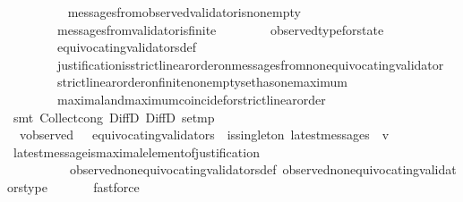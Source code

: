\begin{isabellebody}
\ \isanewline
\ \ \ \ \ \ \ \ messages{\isacharunderscore}from{\isacharunderscore}observed{\isacharunderscore}validator{\isacharunderscore}is{\isacharunderscore}non{\isacharunderscore}empty\isanewline
\ \ \ \ \ \ \ \ messages{\isacharunderscore}from{\isacharunderscore}validator{\isacharunderscore}is{\isacharunderscore}finite\isanewline
\ \ \ \ \ \ \ \ observed{\isacharunderscore}type{\isacharunderscore}for{\isacharunderscore}state\isanewline
\ \ \ \ \ \ \ \ equivocating{\isacharunderscore}validators{\isacharunderscore}def\isanewline
\ \ \ \ \ \ \ \ justification{\isacharunderscore}is{\isacharunderscore}strict{\isacharunderscore}linear{\isacharunderscore}order{\isacharunderscore}on{\isacharunderscore}messages{\isacharunderscore}from{\isacharunderscore}non{\isacharunderscore}equivocating{\isacharunderscore}validator\isanewline
\ \ \ \ \ \ \ \ strict{\isacharunderscore}linear{\isacharunderscore}order{\isacharunderscore}on{\isacharunderscore}finite{\isacharunderscore}non{\isacharunderscore}empty{\isacharunderscore}set{\isacharunderscore}has{\isacharunderscore}one{\isacharunderscore}maximum\isanewline
\ \ \ \ \ \ \ \ maximal{\isacharunderscore}and{\isacharunderscore}maximum{\isacharunderscore}coincide{\isacharunderscore}for{\isacharunderscore}strict{\isacharunderscore}linear{\isacharunderscore}order\isanewline
\ \ \ \ \isamarkupfalse%
\ {\isacharparenleft}smt\ Collect{\isacharunderscore}cong\ DiffD{}\ DiffD{}\ set{\isacharunderscore}mp{\isacharparenright}\isanewline
\ \ \isamarkupfalse%
\ \isamarkupfalse%
\ {\isachardoublequoteopen}{\isasymforall}{\isasymsigma}{\isasymin}{\isasymSigma}{\isachardot}\ {\isasymforall}v{\isasymin}observed\ {\isasymsigma}\ {\isacharminus}\ equivocating{\isacharunderscore}validators\ {\isasymsigma}{\isachardot}\ is{\isacharunderscore}singleton\ {\isacharparenleft}latest{\isacharunderscore}messages\ {\isasymsigma}\ v{\isacharparenright}{\isachardoublequoteclose}\ \ \isanewline
\ \ \ \ \isamarkupfalse%
\ latest{\isacharunderscore}message{\isacharunderscore}is{\isacharunderscore}maximal{\isacharunderscore}element{\isacharunderscore}of{\isacharunderscore}justification\isanewline
\ \ \ \ \ \ \ \ \ \ observed{\isacharunderscore}non{\isacharunderscore}equivocating{\isacharunderscore}validators{\isacharunderscore}def\ observed{\isacharunderscore}non{\isacharunderscore}equivocating{\isacharunderscore}validators{\isacharunderscore}type\ \isanewline
\ \ \ \ \isamarkupfalse%
\ fastforce\isanewline
{}\isamarkupfalse%
%
\endisatagproof

\end{isabellebody}
